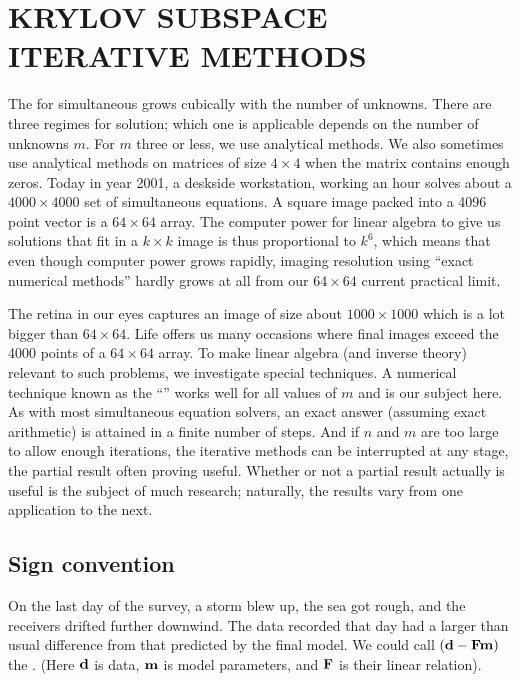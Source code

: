 \section{KRYLOV SUBSPACE ITERATIVE METHODS}
The  for simultaneous 
grows cubically with the number of unknowns.
There are three regimes for solution;
which one is applicable
depends on the number of unknowns $m$.
For $m$ three or less, we use analytical methods.
We also sometimes use analytical methods on matrices of size $4\times 4$
when the matrix contains enough zeros.
Today in year 2001,
a deskside workstation, working an hour solves about a
$4000\times 4000$ set of simultaneous equations.
A square image packed into a 4096 point vector is a $64\times 64$ array.
The computer power for linear algebra to give us solutions that
fit in a $k\times k$ image is thus proportional
to $k^6$, which means that even though computer power grows rapidly,
imaging resolution using ``exact numerical methods'' hardly
grows at all from our $64\times 64$ current practical limit.

\par
The retina in our eyes captures an image of size about $1000\times 1000$
which is a lot bigger than $64\times 64$.
Life offers us many occasions where final images exceed the 4000
points of a $64\times 64$ array.
To make linear algebra (and inverse theory) relevant to such problems,
we investigate special techniques.
A numerical technique known as the
``''
works well for all values of $m$ and is our subject here.
As with most simultaneous equation solvers,
an exact answer (assuming exact arithmetic)
is attained in a finite number of steps.
And if $n$ and $m$ are too large to allow enough iterations,
the iterative methods can be interrupted at any stage,
the partial result often proving useful.
Whether or not a partial result actually is useful
is the subject of much research;
naturally, the results vary from one application to the next.

\subsection{Sign convention}
On the last day of the survey, a storm blew up,
the sea got rough, and the receivers drifted further downwind.
The data recorded that day
had a larger than usual difference
from that predicted by the final model.
We could call
$(\bold d-\bold F\bold m)$
the {\it {}}.
(Here
$\bold d$ is data,
$\bold m$ is model parameters, and
$\bold F$ is their linear relation).

